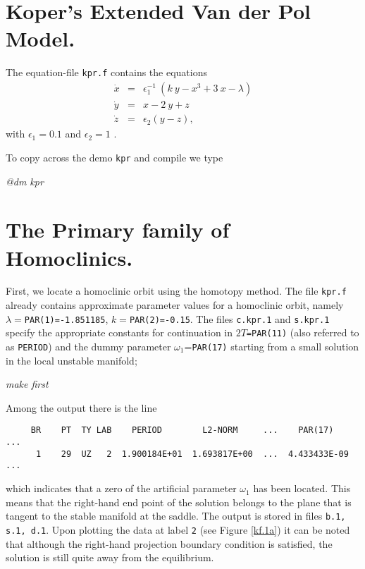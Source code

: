 \documentclass[12pt]{report}
\def\eps{\epsilon}
\begin{document}
\section{ Koper's Extended Van der Pol Model.}
%
The equation-file {\tt kpr.f} contains the equations
\begin{equation} \label{ko} \begin{array}{rcl}
\dot{x} & = & \eps_1^{-1}\:(k\: y - x^3 +3\:x - \lambda) \\
\dot{y} & = & x - 2\: y + z \\
\dot{z} & = & \eps_2(y-z), 
\end{array} \end{equation}
with $\eps_1 =0.1$ and $\eps_2=1$ \cite{Ko:95}.

To copy across the demo {\tt kpr} and compile we type
\begin{center}
{\it @dm kpr} \\
\end{center}

\section{The Primary family of Homoclinics.}
First, we locate a homoclinic orbit using 
the homotopy method. The file {\tt kpr.f} 
already contains 
approximate parameter values for a homoclinic orbit, 
namely $\lambda=${\tt PAR(1)=-1.851185}, $k=${\tt PAR(2)=-0.15}. 
The files {\tt c.kpr.1} and {\tt s.kpr.1} specify the appropriate
constants for continuation in $2T${\tt =PAR(11)} (also referred
to as {\tt PERIOD}) and the dummy parameter $\omega_1$={\tt PAR(17)}
starting
from a small solution in the local unstable manifold; 
\begin{center}
{\it make first}
\end{center}
Among the output there is the line
\begin{verbatim}
     BR    PT  TY LAB    PERIOD        L2-NORM     ...    PAR(17)    ...
      1    29  UZ   2  1.900184E+01  1.693817E+00  ...  4.433433E-09 ... 
\end{verbatim}
which indicates that a zero of the artificial parameter $\omega_1$
has been located. This means that the right-hand end point of the solution
belongs to the plane that is tangent to the stable manifold at the saddle. 
The output is stored in files {\tt b.1, s.1, d.1}. 
Upon plotting the data at label {\tt 2} (see Figure \ref{kf.1a})
it can be noted that although the right-hand projection boundary
condition is satisfied, the solution is still quite away from the
equilibrium. 
\end{document}
